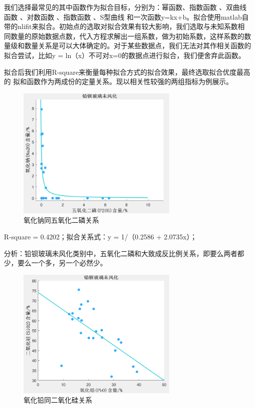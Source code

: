 \documentclass{my_paper}
\begin{document}
我们选择最常见的其中函数作为拟合目标，分别为：幂函数、指数函数 、双曲线函数 、对数函数 、指数函数 、S型曲线 和一次函数y=kx+b。拟合使用matlab自带的nlifit来拟合。初始点的选取对拟合效果有较大影响，我们选取与未知系数相同数量的原始数据点数，代入方程求解出一组系数，做为初始系数，这样系数的数量级和数量关系是可以大体确定的。对于某些数据点，我们无法对其作相关函数的拟合尝试，比如y = ln（x）不可对x=0的数据点进行拟合，我们便舍弃此函数。

拟合后我们利用R-square来衡量每种拟合方式的拟合效果，最终选取拟合优度最高的 拟和函数作为两成份的定量关系。现以相关性较强的两组指标为例展示。

\begin {figure}[h]
\centering %
\includegraphics[width=0.7\textwidth]{st3.png}
\caption{氧化钠同五氧化二磷关系} %
\label{five}
\end {figure}

R-square = 0.4202；拟合关系式：y = 1/（0.2586 + 2.0735x）；

分析：铅钡玻璃未风化类别中，五氧化二磷和大致成反比例关系，即要么两者都少，要么一个多，另一个必然少。

\begin {figure}[h]
\centering %
\includegraphics[width=0.7\textwidth]{st4.png}
\caption{氧化铅同二氧化硅关系} %
\label{five}
\end {figure}
\end{document}
